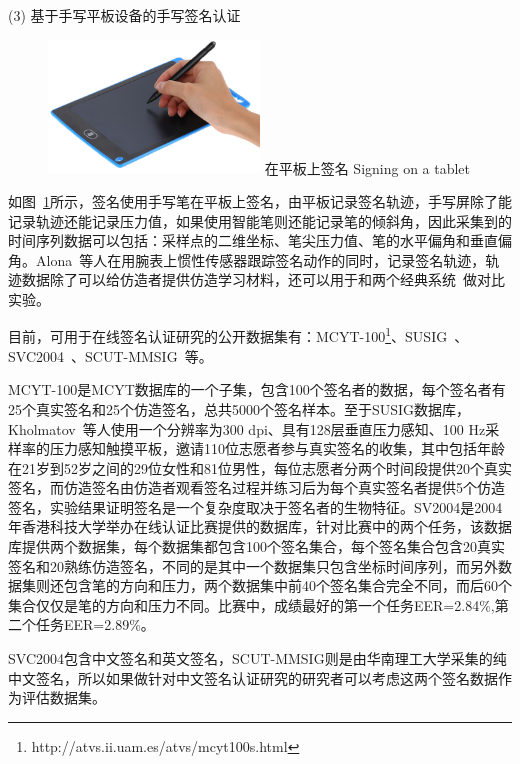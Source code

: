 (3) 基于手写平板设备的手写签名认证

\begin{figure}[!htp]
  \centering
  \includegraphics[width=0.5\textwidth]{figure/tablet.png}
  \bicaption
    {在平板上签名}
    {Signing on a tablet}
  \label{fig:signing-tablet}
\end{figure}
如图~\ref{fig:signing-tablet}所示，签名使用手写笔在平板上签名，由平板记录签名轨迹，手写屏除了能记录轨迹还能记录压力值，如果使用智能笔则还能记录笔的倾斜角，因此采集到的时间序列数据可以包括：采样点的二维坐标、笔尖压力值、笔的水平偏角和垂直偏角。Alona~\cite{Levy2018Handwritten}等人在用腕表上惯性传感器跟踪签名动作的同时，记录签名轨迹，轨迹数据除了可以给仿造者提供仿造学习材料，还可以用于和两个经典系统~\cite{fischer2015robust,kholmatov2005identity}做对比实验。

目前，可用于在线签名认证研究的公开数据集有：MCYT-100\footnote{http://atvs.ii.uam.es/atvs/mcyt100s.html}、SUSIG~\cite{kholmatov2006sigsa}、SVC2004~\cite{10.1007/978-3-540-25948-0_3}、SCUT-MMSIG~\cite{10.1007/978-3-319-69923-3_78}等。

MCYT-100是MCYT数据库的一个子集，包含100个签名者的数据，每个签名者有25个真实签名和25个仿造签名，总共5000个签名样本。至于SUSIG数据库，Kholmatov~\cite{kholmatov2006sigsa}等人使用一个分辨率为300 dpi、具有128层垂直压力感知、100 Hz采样率的压力感知触摸平板，邀请110位志愿者参与真实签名的收集，其中包括年龄在21岁到52岁之间的29位女性和81位男性，每位志愿者分两个时间段提供20个真实签名，而仿造签名由仿造者观看签名过程并练习后为每个真实签名者提供5个仿造签名，实验结果证明签名是一个复杂度取决于签名者的生物特征。SV2004是2004年香港科技大学举办在线认证比赛提供的数据库，针对比赛中的两个任务，该数据库提供两个数据集，每个数据集都包含100个签名集合，每个签名集合包含20真实签名和20熟练仿造签名，不同的是其中一个数据集只包含坐标时间序列，而另外数据集则还包含笔的方向和压力，两个数据集中前40个签名集合完全不同，而后60个集合仅仅是笔的方向和压力不同。比赛中，成绩最好的第一个任务EER=2.84\%,第二个任务EER=2.89\%。

SVC2004包含中文签名和英文签名，SCUT-MMSIG则是由华南理工大学采集的纯中文签名，所以如果做针对中文签名认证研究的研究者可以考虑这两个签名数据作为评估数据集。


